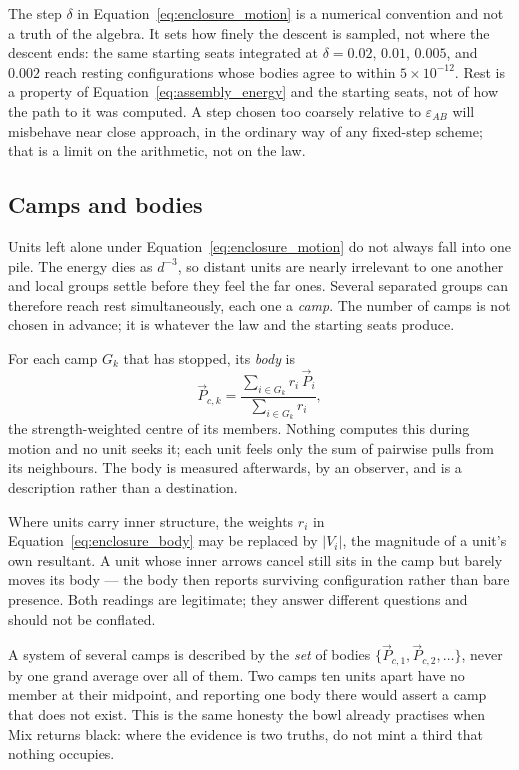 \documentclass[12pt, a4paper]{article}
\begin{document}
The step $\delta$ in Equation~\eqref{eq:enclosure_motion} is a
numerical convention and not a truth of the algebra. It sets how
finely the descent is sampled, not where the descent ends: the same
starting seats integrated at $\delta = 0.02$, $0.01$, $0.005$, and
$0.002$ reach resting configurations whose bodies agree to within
$5\times 10^{-12}$. Rest is a property of
Equation~\eqref{eq:assembly_energy} and the starting seats, not of
how the path to it was computed. A step chosen too coarsely relative
to $\varepsilon_{AB}$ will misbehave near close approach, in the
ordinary way of any fixed-step scheme; that is a limit on the
arithmetic, not on the law.

\subsection{Camps and bodies}
\label{subsec:enclosure_camps}
Units left alone under Equation~\eqref{eq:enclosure_motion} do not
always fall into one pile. The energy dies as $d^{-3}$, so distant
units are nearly irrelevant to one another and local groups settle
before they feel the far ones. Several separated groups can
therefore reach rest simultaneously, each one a \emph{camp}. The
number of camps is not chosen in advance; it is whatever the law and
the starting seats produce.

For each camp $G_k$ that has stopped, its \emph{body} is
\begin{equation}
    \vec P_{c,k}
    = \frac{\sum_{i\in G_k} r_i\,\vec P_i}{\sum_{i\in G_k} r_i},
    \label{eq:enclosure_body}
\end{equation}
the strength-weighted centre of its members. Nothing computes this
during motion and no unit seeks it; each unit feels only the sum of
pairwise pulls from its neighbours. The body is measured afterwards,
by an observer, and is a description rather than a destination.

Where units carry inner structure, the weights $r_i$ in
Equation~\eqref{eq:enclosure_body} may be replaced by
$\lvert V_i\rvert$, the magnitude of a unit's own resultant. A unit
whose inner arrows cancel still sits in the camp but barely moves its
body --- the body then reports surviving configuration rather than
bare presence. Both readings are legitimate; they answer different
questions and should not be conflated.

A system of several camps is described by the \emph{set} of bodies
$\{\vec P_{c,1},\vec P_{c,2},\ldots\}$, never by one grand average
over all of them. Two camps ten units apart have no member at their
midpoint, and reporting one body there would assert a camp that does
not exist. This is the same honesty the bowl already practises when
Mix returns black: where the evidence is two truths, do not mint a
third that nothing occupies.
\end{document}
